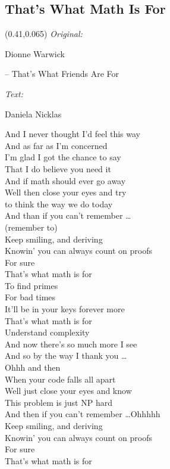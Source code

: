 \documentclass[11pt,a5paper]{article}
\newcommand\songinfo[2]{\begin{textblock}{0.5}(0.41,0.065)
		\footnotesize
		\hfill \textit{Original:} \ \ \ \ \ \ \ \ \ \ \ \ \ \ \ \ \ \ \ \ 
		
		\hfill #1
		
		\hfill  \textit{Text:} \ \ \ \ \ \ \ \ \ \ \ \ \ \ \ \ \ \ \ \ 
		
		\hfill #2
	\end{textblock}}
\begin{document}
			\subsection{That's What Math Is For}
			\songinfo{Dionne Warwick 
				
				\hfill -- That's What Friends Are For}{Daniela Nicklas}
			And I never thought I'd feel this way \\
			And as far as I'm concerned \\
			I'm glad I got the chance to say \\
			That I do believe you need it \\
			
			And if math should ever go away \\
			Well then close your eyes and try \\
			to think the way we do today \\
			And than if you can't remember \ldots \\
			
			(remember to) \\
			Keep smiling, and deriving \\
			Knowin' you can always count on proofs \\
			For sure \\
			That’s what math is for \\
			
			To find primes \\
			For bad times \\
			It’ll be in your keys forever more \\
			That's what math is for \\
			
			Understand complexity \\
			And now there's so much more I see \\
			And so by the way I thank you \ldots \\
			
			Ohhh and then \\
			When your code falls all apart \\
			Well just close your eyes and know \\
			This problem is just NP hard \\
			And then if you can't remember \ldots Ohhhhh \\
			Keep smiling, and deriving \\
			Knowin' you can always count on proofs \\
			For sure \\
			That’s what math is for \\
			
\end{document}
